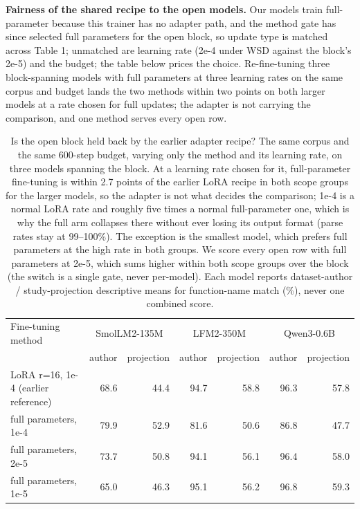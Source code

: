 \documentclass{article}
\begin{document}
\textbf{Fairness of the shared recipe to the open models.} Our models train full-parameter because this trainer has no adapter path, and the method gate has since selected full parameters for the open block, so update type is matched across Table 1; unmatched are learning rate (2e-4 under WSD against the block's 2e-5) and the budget; the table below prices the choice. Re-fine-tuning three block-spanning models with full parameters at three learning rates on the same corpus and budget lands the two methods within two points on both larger models at a rate chosen for full updates; the adapter is not carrying the comparison, and one method serves every open row.


\begin{table}[htbp]
\caption{Is the open block held back by the earlier adapter recipe? The same corpus and the same 600-step budget, varying only the method and its learning rate, on three models spanning the block. At a learning rate chosen for it, full-parameter fine-tuning is within 2.7 points of the earlier LoRA recipe in both scope groups for the larger models, so the adapter is not what decides the comparison; 1e-4 is a normal LoRA rate and roughly five times a normal full-parameter one, which is why the full arm collapses there without ever losing its output format (parse rates stay at 99--100\%). The exception is the smallest model, which prefers full parameters at the high rate in both groups. We score every open row with full parameters at 2e-5, which sums higher within both scope groups over the block (the switch is a single gate, never per-model). Each model reports dataset-author / study-projection descriptive means for function-name match (\%), never one combined score.}
\label{tab:ftmethod}
\centering
\footnotesize\setlength{\aboverulesep}{0pt}\setlength{\belowrulesep}{0pt}
\begin{tabular}{l|rr|rr|rr}
\toprule
Fine-tuning method & \multicolumn{2}{c}{SmolLM2-135M} & \multicolumn{2}{c}{LFM2-350M} & \multicolumn{2}{c}{Qwen3-0.6B} \\
 & author & projection & author & projection & author & projection \\
\midrule
LoRA r=16, 1e-4 (earlier reference) & 68.6 & 44.4 & 94.7 & 58.8 & 96.3 & 57.8 \\
full parameters, 1e-4 & 79.9 & 52.9 & 81.6 & 50.6 & 86.8 & 47.7 \\
full parameters, 2e-5 & 73.7 & 50.8 & 94.1 & 56.1 & 96.4 & 58.0 \\
full parameters, 1e-5 & 65.0 & 46.3 & 95.1 & 56.2 & 96.8 & 59.3 \\
\bottomrule
\end{tabular}
\end{table}
\end{document}
